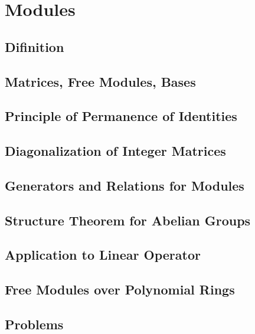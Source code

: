 \chapter{Modules}
\section{Difinition}
\section{Matrices, Free Modules, Bases}
\section{Principle of Permanence of Identities}
\section{Diagonalization of Integer Matrices}
\section{Generators and Relations for Modules}
\section{Structure Theorem for Abelian Groups}
\section{Application to Linear Operator}
\section{Free Modules over Polynomial Rings}
\section{Problems}